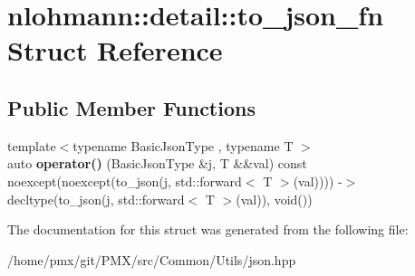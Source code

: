 \hypertarget{structnlohmann_1_1detail_1_1to__json__fn}{}\section{nlohmann\+:\+:detail\+:\+:to\+\_\+json\+\_\+fn Struct Reference}
\label{structnlohmann_1_1detail_1_1to__json__fn}
\subsection*{Public Member Functions}
\begin{DoxyCompactItemize}
\item 
\mbox{\label{structnlohmann_1_1detail_1_1to__json__fn_aecfb5114c8a737fc89d98589482795b8}} 
{\footnotesize template$<$typename Basic\+Json\+Type , typename T $>$ }\\auto {\bfseries operator()} (Basic\+Json\+Type \&j, T \&\&val) const noexcept(noexcept(to\+\_\+json(j, std\+::forward$<$ T $>$(val)))) -\/$>$ decltype(to\+\_\+json(j, std\+::forward$<$ T $>$(val)), void())
\end{DoxyCompactItemize}


The documentation for this struct was generated from the following file\+:\begin{DoxyCompactItemize}
\item 
/home/pmx/git/\+P\+M\+X/src/\+Common/\+Utils/json.\+hpp\end{DoxyCompactItemize}
